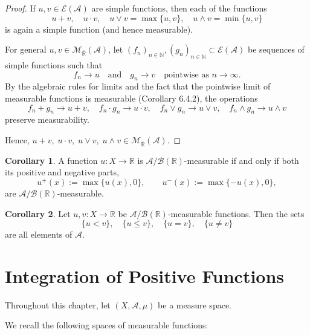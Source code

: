 \documentclass[12pt]{article}
\theoremstyle{definition}
\newtheorem{corollary}{Corollary}[theorem]
\begin{document}
\begin{proof}
If \( u, v \in \mathcal{E}(\mathcal{A}) \) are simple functions, then each of the functions
\[
u + v, \quad u \cdot v, \quad u \vee v = \max\{u, v\}, \quad u \wedge v = \min\{u, v\}
\]
is again a simple function (and hence measurable).

For general \( u, v \in \mathcal{M}_{\overline{\mathbb{R}}}(\mathcal{A}) \), let \( (f_n)_{n \in \mathbb{N}}, (g_n)_{n \in \mathbb{N}} \subset \mathcal{E}(\mathcal{A}) \) be sequences of simple functions such that
\[
f_n \to u \quad \text{and} \quad g_n \to v \quad \text{pointwise as } n \to \infty.
\]
By the algebraic rules for limits and the fact that the pointwise limit of measurable functions is measurable (Corollary 6.4.2), the operations
\[
f_n + g_n \to u + v, \quad f_n \cdot g_n \to u \cdot v, \quad f_n \vee g_n \to u \vee v, \quad f_n \wedge g_n \to u \wedge v
\]
preserve measurability.

Hence, \( u + v, \; u \cdot v, \; u \vee v, \; u \wedge v \in \mathcal{M}_{\overline{\mathbb{R}}}(\mathcal{A}) \).
\end{proof}

\medskip
\begin{corollary}
A function \( u : X \to \mathbb{R} \) is \( \mathcal{A} / \mathcal{B}(\mathbb{R}) \)-measurable if and only if both its positive and negative parts,
\[
u^+(x) := \max\{u(x), 0\}, \qquad u^-(x) := \max\{-u(x), 0\},
\]
are \( \mathcal{A} / \mathcal{B}(\mathbb{R}) \)-measurable.
\end{corollary}

\begin{corollary}
Let \( u, v : X \to \mathbb{R} \) be \( \mathcal{A} / \mathcal{B}(\mathbb{R}) \)-measurable functions. Then the sets
\[
\{ u < v \}, \quad \{ u \leq v \}, \quad \{ u = v \}, \quad \{ u \neq v \}
\]
are all elements of \( \mathcal{A} \).
\end{corollary}

\vspace{3em}
\section{Integration of Positive Functions}

\medskip
Throughout this chapter, let \( (X, \mathcal{A}, \mu) \) be a measure space.

We recall the following spaces of measurable functions:
\end{document}
